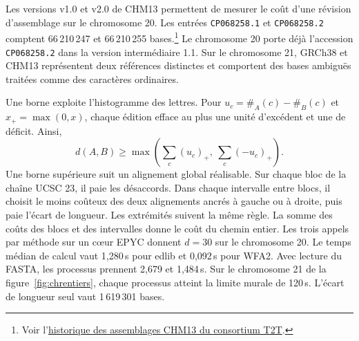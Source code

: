 Les versions v1.0 et v2.0 de CHM13 permettent de mesurer le coût d'une révision d'assemblage sur le chromosome 20. Les entrées \texttt{CP068258.1} et \texttt{CP068258.2} comptent 66\,210\,247 et 66\,210\,255 bases.\footnote{Voir l'\href{https://github.com/marbl/CHM13/blob/master/Earlier_assembly_releases_and_associated_data.md}{historique des assemblages CHM13 du consortium T2T}.} Le chromosome 20 porte déjà l'accession \texttt{CP068258.2} dans la version intermédiaire 1.1. Sur le chromosome 21, GRCh38 et CHM13 représentent deux références distinctes et comportent des bases ambiguës traitées comme des caractères ordinaires.

Une borne exploite l'histogramme des lettres. Pour \(u_c=\#_A(c)-\#_B(c)\) et \(x_+=\max(0,x)\), chaque édition efface au plus une unité d'excédent et une de déficit. Ainsi,
\[
 d(A,B)\ge\max\!\left(\sum_c(u_c)_+,\ \sum_c(-u_c)_+\right).
\]
Une borne supérieure suit un alignement global réalisable. Sur chaque bloc de la chaîne UCSC 23, il paie les désaccords. Dans chaque intervalle entre blocs, il choisit le moins coûteux des deux alignements ancrés à gauche ou à droite, puis paie l'écart de longueur. Les extrémités suivent la même règle. La somme des coûts des blocs et des intervalles donne le coût du chemin entier.
Les trois appels par méthode sur un cœur EPYC donnent \(d=30\) sur le chromosome 20. Le temps médian de calcul vaut 1,280\,s pour edlib et 0,092\,s pour WFA2. Avec lecture du FASTA, les processus prennent 2,679 et 1,484\,s. Sur le chromosome 21 de la figure~\ref{fig:chrentiers}, chaque processus atteint la limite murale de 120\,s. L'écart de longueur seul vaut 1\,619\,301 bases.
